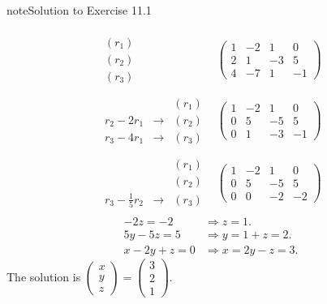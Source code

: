 \documentclass[letterpaper,10pt,english]{jupyterBook}
\begin{document}
\begin{sphinxadmonition}{note}{Solution to Exercise 11.1}



\sphinxAtStartPar
{}
\begin{equation*}
\begin{split}
\begin{array}{rc}
\begin{array}{r}
 (r_1)\\
 (r_2)\\
 (r_3)
\end{array}
&
\left(
\begin{array}{ccc|c}
1 & -2 & 1 & 0 \\
2 & 1 & -3 & 5 \\
4 & -7 & 1 & -1
\end{array}
\right)\\ \\
\begin{array}{ccr}
 & & (r_1)\\
r_2-2r_1 & \longrightarrow & (r_2) \\
r_3-4r_1 & \longrightarrow & (r_3)
\end{array}
&
\left(
\begin{array}{ccc|c}
1 & -2 & 1 & 0 \\
0 & 5 & -5 & 5 \\
0 & 1 & -3 & -1
\end{array}
\right) \\ \\
\begin{array}{ccr}
 & & (r_1)\\
& & (r_2) \\
r_3-\frac{1}{5}r_2 & \longrightarrow & (r_3)
\end{array}
&
\left(
\begin{array}{ccc|c}
1 & -2 & 1 & 0 \\
0 & 5 & -5 & 5 \\
0 & 0 & -2 & -2
\end{array}
\right)
\end{array}
\end{split}
\end{equation*}
\sphinxAtStartPar
{}
\begin{align*}
-2z = -2 &\Rightarrow z = 1.\\
5y - 5z = 5 &\Rightarrow y = 1 + z = 2.\\
x - 2y + z = 0 &\Rightarrow x = 2y-z = 3.
\end{align*}
\sphinxAtStartPar
The solution is \(\begin{pmatrix}x\\y\\z\end{pmatrix} = \begin{pmatrix}3\\2\\1\end{pmatrix}\).
\end{sphinxadmonition}
 \label{LinearAlgebra/linear_systems_matrices/echelon_form:LinearAlgebra/linear_systems_matrices/echelon_form-solution-5}
\end{document}
